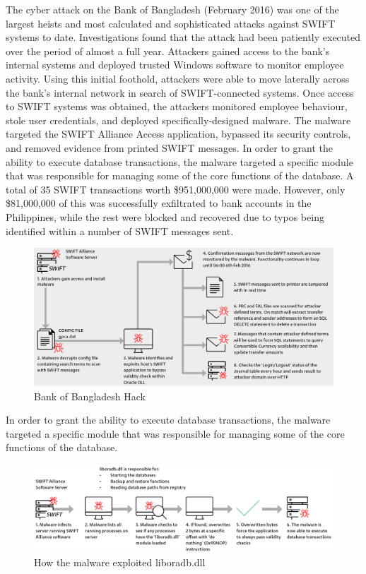 \documentclass[12pt]{article}
\begin{document}
        The cyber attack on the Bank of Bangladesh (February 2016) was one of the largest heists and most calculated and sophisticated attacks against SWIFT systems to date. Investigations found that the attack had been patiently executed over the period of almost a full year. Attackers gained access to the bank’s internal systems and deployed trusted Windows software to monitor employee activity. Using this initial foothold, attackers were able to move laterally across the bank’s internal network in search of SWIFT-connected systems. Once access to SWIFT systems was obtained, the attackers monitored employee behaviour, stole user credentials, and deployed specifically-designed malware. The malware targeted the SWIFT Alliance Access application, bypassed its security controls, and removed evidence from printed SWIFT messages.
        In order to grant the ability to execute database transactions, the malware targeted a specific module that was responsible for managing some of the core functions of the database.
        A total of 35 SWIFT transactions worth \$951,000,000 were made. However, only \$81,000,000 of this was successfully exfiltrated to bank accounts in the Philippines, while the rest were blocked and recovered due to typos being identified within a number of SWIFT messages sent.
        
        \begin{figure}[H]
        \centering
        \includegraphics[width=\textwidth]{figures/Bangladesh.png}
        \caption{Bank of Bangladesh Hack}
        \label{fig:Bangladesh}
        \end{figure}
        
        In order to grant the ability to execute database transactions, the malware targeted a specific module that was responsible for managing some of the core functions of the database.
        
        \begin{figure}[H]
        \centering
        \includegraphics[width=\textwidth]{figures/liboradb.png}
        \caption{How the malware exploited liboradb.dll}
        \label{fig:liboradb}
        \end{figure}
        
\end{document}
